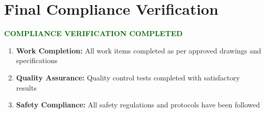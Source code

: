 \documentclass[12pt,a4paper]{article}
\newcommand{\rupees}[1]{₹\,#1}
\newcommand{\checkbox}{\makebox[1em]{$\boxtimes$}}
\begin{document}
\begin{center}
{\begin{minipage}{0.95\textwidth}
\begin{center}
\end{center}

\vspace{1cm}
\section*{Final Compliance Verification}

\begin{center}
\colorbox{lightgray!50}{\begin{minipage}{0.9\textwidth}
\textbf{\textcolor{darkgreen}{COMPLIANCE VERIFICATION COMPLETED}}

\vspace{0.5cm}
\begin{enumerate}[leftmargin=1cm]
\item \checkbox \textbf{Work Completion:} All work items completed as per approved drawings and specifications

\item \checkbox \textbf{Quality Assurance:} Quality control tests completed with satisfactory results

\item \checkbox \textbf{Safety Compliance:} All safety regulations and protocols have been followed


\end{enumerate}
\end{minipage}}
\end{center}
\end{minipage}}
\end{center}
\end{document}
